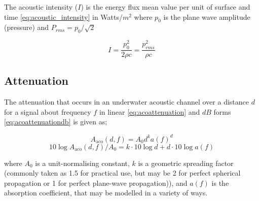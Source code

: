 The acoustic intensity ($I$) is the energy flux mean value per unit of surface and time \autoref{eq:acoustic_intensity} in Watts/$m^2$ where $p_0$ is the plane wave amplitude (pressure) and $P_{rms} = p_0/\sqrt{2}$

\begin{equation}
  I = \frac{p_0^2}{2\rho c} = \frac{p_{rms}^2}{\rho c}
  \label{eq:acoustic_intensity}
\end{equation}

\subsection{Attenuation}\label{sec:attenuation}

The attenuation that occurs in an underwater acoustic channel over a distance $d$ for a signal about frequency $f$ in linear \autoref{eq:acoattenuation} and $dB$ forms \autoref{eq:acoattenuationdb} is given as;

\begin{equation}
  \label{eq:acoattenuation}
  A_{\text{aco}}(d,f) = A_0d^ka(f)^d
\end{equation}
\begin{equation}
  \label{eq:acoattenuationdb}
  10 \log A_{\text{aco}}(d,f)/A_0 = k \cdot 10 \log d + d \cdot 10 \log a(f)
\end{equation}

where $A_0$ is a unit-normalising constant, $k$ is a geometric spreading factor (commonly taken as 1.5 for practical use, but may be 2 for perfect spherical propagation or 1 for perfect plane-wave propagation)), and $a(f)$ is the absorption coefficient, that may be modelled in a variety of ways.

